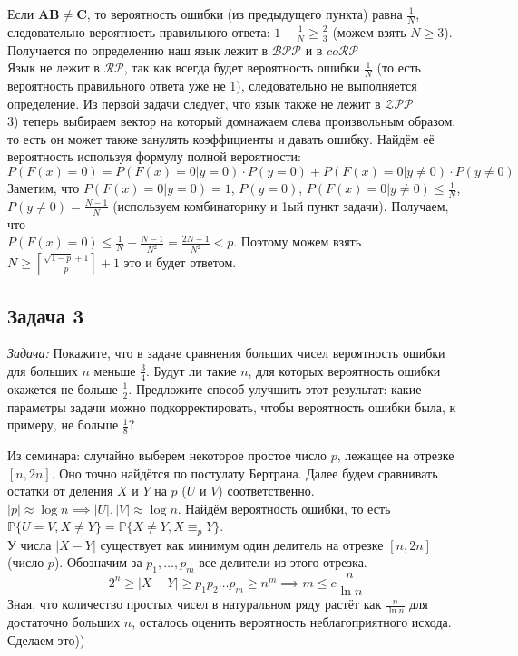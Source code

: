 \documentclass[a4paper,12pt]{article} %
\begin{document}
Если $\mathbf{AB}\neq\mathbf{C}$, то вероятность ошибки (из предыдущего пункта) равна $ \frac{1}{N} $, следовательно вероятность правильного ответа: $ 1 - \frac{1}{N} \geqslant \frac{2}{3} $ (можем взять $ N \geqslant 3 $). Получается по определению наш язык лежит в $ \mathcal{BPP} $ и в $ co\mathcal{RP} $\\

Язык не лежит в $ \mathcal{RP} $, так как всегда будет вероятность ошибки $ \frac{1}{N} $ (то есть вероятность правильного ответа уже не 1), следовательно не выполняется определение. Из первой задачи следует, что язык также не лежит в $ \mathcal{ZPP} $\\

3) теперь выбираем вектор на который домнажаем слева произвольным образом, то есть он может также занулять коэффициенты и давать ошибку. Найдём её вероятность используя формулу полной вероятности:
$$
P(F(x)=0) = P(F(x)=0|y=0) \cdot P(y=0) + P(F(x)=0|y\neq 0)\cdot P(y \neq 0)
$$
Заметим, что $ P(F(x)=0|y=0) = 1 $, $ P(y=0) $, $ P(F(x)=0|y\neq 0) \leqslant \frac{1}{N} $, $ P(y \neq 0) = \frac{N-1}{N}$ (используем комбинаторику и 1ый пункт задачи). Получаем, что \\
$ P(F(x)=0) \leqslant \frac{1}{N} + \frac{N-1}{N^2} = \frac{2N-1}{N^2} < p $. Поэтому можем взять $ N \geqslant \left[\frac{\sqrt{1-p}+1}{p} \right] +1 $ это и будет ответом.


\subsection*{Задача 3}
\textit{Задача:} Покажите, что в задаче сравнения больших чисел вероятность ошибки для больших $n$ меньше $\frac{3}{4}$. Будут ли такие $n$, для которых вероятность ошибки окажется не больше $\frac{1}{2}$. Предложите способ улучшить этот результат: какие параметры задачи можно подкорректировать, чтобы вероятность ошибки была, к примеру, не больше $\frac{1}{8}$?\\ \smallskip

Из семинара: случайно выберем некоторое простое число $p$, лежащее на отрезке $[n, 2n]$. Оно точно найдётся по постулату Бертрана. Далее будем сравнивать остатки от деления $X$ и $Y$ на $p$ ($U$ и $V$) соответственно. \\
$|p| \approx \log n \implies |U|, |V| \approx \log n$.
Найдём вероятность ошибки, то есть $\mathbb{P}\{U = V, X \neq Y\} = \mathbb{P}\{X\neq Y, X \equiv_p Y\}$. \\
У числа $|X-Y|$ существует как минимум один делитель на отрезке $[n, 2n]$ (число $p$). Обозначим за $p_1, \dotsc, p_m$ все делители из этого отрезка.
\[2^{n} \geqslant |X-Y| \geqslant p_1p_2\dotsc p_m\geqslant n^m \implies m \leqslant c\dfrac{n}{\ln n}\]
Зная, что количество простых чисел в натуральном ряду растёт как $\frac{n}{\ln n}$ для достаточно больших $n$, осталось оценить вероятность неблагоприятного исхода. Сделаем это))\\
\end{document}

